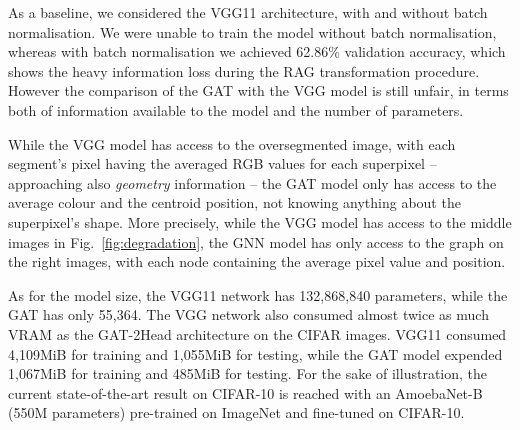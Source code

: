 \documentclass[twocolumn]{article}
\begin{document}
As a baseline, we 
considered
the VGG11 \cite{simonyan2015very} architecture, with and without batch normalisation. We were unable to train the model without
batch normalisation,
whereas with batch normalisation we achieved 62.86\% validation accuracy, which shows the heavy information loss during the RAG transformation procedure. However the comparison of the GAT with the VGG model is still unfair, in terms both of information available to the model and the number of parameters.

While the VGG model has access to the oversegmented
image, with each segment's pixel having the averaged RGB values for each superpixel -- approaching also \emph{geometry} information --
the GAT model only has access to the average colour and the centroid position, 
not knowing anything about the superpixel's shape.
More precisely, while the VGG model has access to the middle images in Fig.~\ref{fig:degradation}, the GNN model has only access to the graph on the right images, with each node containing the average pixel value and position.

As for the model size, the VGG11 network has 132,868,840 parameters, while the GAT 
has only 55,364. The VGG network also consumed almost twice as much VRAM as the GAT-2Head architecture on the CIFAR images. 
VGG11 consumed 4,109MiB for training and 1,055MiB for testing, while the GAT model expended 1,067MiB for training and 485MiB for testing. For the sake of illustration, the current state-of-the-art result on CIFAR-10 \cite{huang2019gpipe} is reached with an  AmoebaNet-B (550M parameters) pre-trained on ImageNet and fine-tuned on CIFAR-10. 
\end{document}
